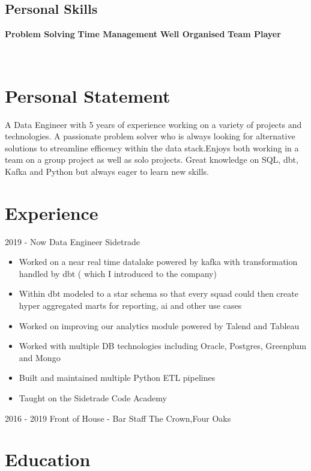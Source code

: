 \documentclass[]{friggeri-cv}
\begin{document}
\begin{aside}
  \section{Personal Skills}
    \textbf{Problem Solving}
    \textbf{Time Management}
    \textbf{Well Organised}
    \textbf{Team Player}    
    ~
\end{aside}
~
\section{Personal Statement}
A Data Engineer with 5 years of experience working on a variety of projects and technologies. A passionate problem solver who is always looking for alternative solutions to streamline efficency within the data stack.Enjoys both working in a team on a group project as well as solo projects. Great knowledge on SQL, dbt, Kafka and Python but always eager to learn new skills. 
\section{Experience}
\begin{entrylist}
  \entry
  {2019 - Now}
  {Data Engineer}
  {Sidetrade}
  {  
  \begin{itemize}
    \item Worked on a near real time datalake powered by kafka with transformation handled by dbt ( which I introduced to the company) 
    \item Within dbt modeled to a star schema so that every squad could then create hyper aggregated marts for reporting, ai and other use cases
    \item Worked on improving our analytics module powered by Talend and Tableau
    \item Worked with multiple DB technologies including Oracle, Postgres, Greenplum and Mongo
    \item Built and maintained multiple Python ETL pipelines  
    \item Taught on the Sidetrade Code Academy 
  \end{itemize}}
  \entry
  {2016 - 2019}
  {Front of House - Bar Staff}
  {The Crown,Four Oaks}

\end{entrylist}

\section{Education}
\end{document}
